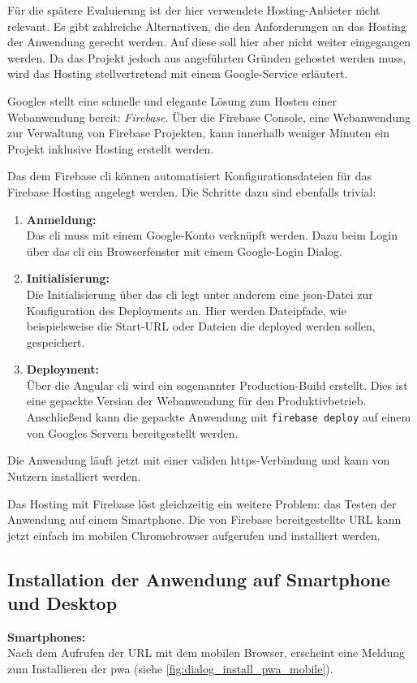 Für die spätere Evaluierung ist der hier verwendete Hosting-Anbieter nicht relevant. Es gibt zahlreiche Alternativen, die den Anforderungen an das Hosting der Anwendung gerecht werden. Auf diese soll hier aber nicht weiter eingegangen werden. Da das Projekt jedoch aus angeführten Gründen gehostet werden muss, wird das Hosting stellvertretend mit einem Google-Service erläutert.

Googles stellt eine schnelle und elegante Lösung zum Hosten einer Webanwendung bereit: \textit{Firebase}. Über die Firebase Console, eine Webanwendung zur Verwaltung von Firebase Projekten, kann innerhalb weniger Minuten ein Projekt inklusive Hosting erstellt werden. 



Das dem Firebase \ac{cli} können automatisiert Konfigurationsdateien für das Firebase Hosting angelegt werden. Die Schritte dazu sind ebenfalls trivial:
\begin{enumerate}
	\item \textbf{Anmeldung: \\}
	      Das \ac{cli} muss mit einem Google-Konto verknüpft werden. Dazu beim Login über das \ac{cli} ein Browserfenster mit einem Google-Login Dialog.
	\item \textbf{Initialisierung: \\}
	      Die Initialisierung über das \ac{cli} legt unter anderem eine \ac{json}-Datei zur Konfiguration des Deployments an. Hier werden Dateipfade, wie beispielsweise die Start-URL oder Dateien die deployed werden sollen, gespeichert.
	\item \textbf{Deployment: \\}
	      Über die Angular \ac{cli} wird ein sogenannter Production-Build erstellt. Dies ist eine gepackte Version der Webanwendung für den Produktivbetrieb.
	      Anschließend kann die gepackte Anwendung mit \texttt{firebase deploy} auf einem von Googles Servern bereitgestellt werden.
\end{enumerate}

Die Anwendung läuft jetzt mit einer validen \ac{https}-Verbindung und kann von Nutzern installiert werden.

Das Hosting mit Firebase löst gleichzeitig ein weitere Problem: das Testen der Anwendung auf einem Smartphone. Die von Firebase bereitgestellte URL kann jetzt einfach im mobilen Chromebrowser aufgerufen und installiert werden.

\subsection{Installation der Anwendung auf Smartphone und Desktop}
\textbf{Smartphones:}\\
Nach dem Aufrufen der URL mit dem mobilen Browser, erscheint eine Meldung zum Installieren der \ac{pwa} (siehe \ref{fig:dialog_install_pwa_mobile}).

